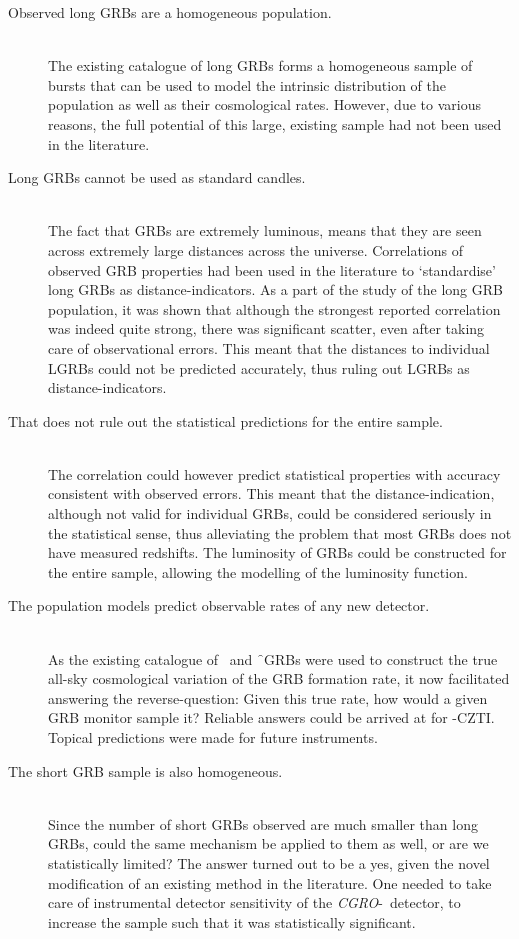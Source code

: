 \begin{description}

\item[Observed long GRBs are a homogeneous population.]  \hfill \\
The existing catalogue of long GRBs forms a homogeneous sample of bursts that can be used to model the intrinsic distribution of the population as well as their cosmological rates. However, due to various reasons, the full potential of this large, existing sample had not been used in the literature.

\item[Long GRBs cannot be used as standard candles.] \hfill \\
The fact that GRBs are extremely luminous, means that they are seen across extremely large distances across the universe. Correlations of observed GRB properties had been used in the literature to `standardise' long GRBs as distance-indicators. As a part of the study of the long GRB population, it was shown that although the strongest reported correlation was indeed quite strong, there was significant scatter, even after taking care of observational errors. This meant that the distances to individual LGRBs could not be predicted accurately, thus ruling out LGRBs as distance-indicators.

\item[That does not rule out the statistical predictions for the entire sample.] \hfill \\
The correlation could however predict statistical properties with accuracy consistent with observed errors. This meant that the distance-indication, although not valid for individual GRBs, could be considered seriously in the statistical sense, thus alleviating the problem that most GRBs does not have measured redshifts. The luminosity of GRBs could be constructed for the entire sample, allowing the modelling of the luminosity function.

\item[The population models predict observable rates of any new detector.] \hfill \\
As the existing catalogue of \s\ and \f\ GRBs were used to construct the true all-sky cosmological variation of the GRB formation rate, it now facilitated answering the reverse-question: Given this true rate, how would a given GRB monitor sample it? Reliable answers could be arrived at for \AS -CZTI. Topical predictions were made for future instruments.

\item[The short GRB sample is also homogeneous.] \hfill \\
Since the number of short GRBs observed are much smaller than long GRBs, could the same mechanism be applied to them as well, or are we statistically limited? The answer turned out to be a yes, given the novel modification of an existing method in the literature. One needed to take care of instrumental detector sensitivity of the \emph{CGRO}-\B\ detector, to increase the sample such that it was statistically significant.


\end{description}
